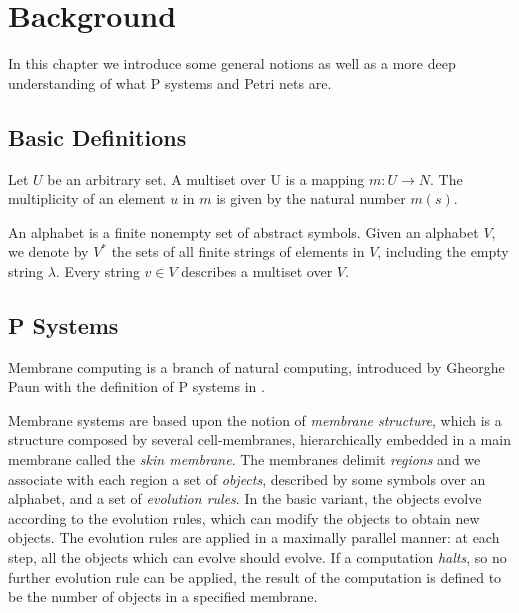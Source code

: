 \chapter{Background}

In this chapter we introduce some general notions as well as a more deep understanding of what P systems and Petri nets are.

\section{Basic Definitions}

\begin{definition}[Multiset]
Let $U$ be an arbitrary set. A multiset over U is a mapping \newline $m : U \rightarrow N$.
The multiplicity of an element $u$ in $m$ is given by the natural number $m(s)$.
\end{definition}

\begin{definition}[Alphabet]
An alphabet is a finite nonempty set of abstract symbols. Given an alphabet $V$, we denote by $V^*$
the sets of all finite strings of elements in $V$, including the empty string $\lambda$.
Every string $v \in V$ describes a multiset over $V$.
\end{definition}

\section{P Systems}

Membrane computing is a branch of natural computing, introduced by Gheorghe Paun with the definition of P systems in \cite{puaun2000computing,puaun2002membrane,paun1999computing}.

Membrane systems are based upon the notion of \textit{membrane structure}, which is a structure composed by several cell-membranes, hierarchically embedded in a main membrane called the \textit{skin membrane}.
The membranes delimit \textit{regions} and we associate with each region a set of \textit{objects}, described by some symbols over an alphabet, and a set of \textit{evolution rules}.
In the basic variant, the objects evolve according to the evolution rules, which can modify the objects to obtain new objects.
The evolution rules are applied in a maximally parallel manner: at each step, all the objects which can evolve should evolve.
If a computation \textit{halts}, so no further evolution rule can be applied, the result of the computation is defined to be the number of objects in a specified membrane.

